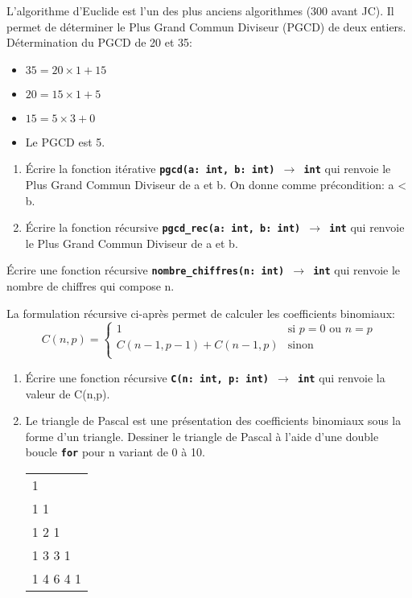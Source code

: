 \documentclass[a4paper,11pt]{article}
\begin{document}
\begin{exo}
    L'algorithme d'Euclide est l'un des plus anciens algorithmes (300 avant JC). Il permet de déterminer le Plus Grand Commun Diviseur (PGCD) de deux entiers.\\Détermination du PGCD de 20 et 35:
    \begin{itemize}
        \item $35=20×1+15$
        \item $20 = 15×1 + 5$
        \item $15 = 5×3 + 0$
        \item Le PGCD est 5.
    \end{itemize}
    \begin{enumerate}
        \item Écrire la fonction itérative \texttt{\textbf{pgcd(a: int, b: int) $\rightarrow$ int}} qui renvoie le Plus Grand Commun Diviseur de a et b. On donne comme précondition: a < b.
        \item Écrire la fonction récursive \texttt{\textbf{pgcd\_rec(a: int, b: int) $\rightarrow$ int}} qui renvoie le Plus Grand Commun Diviseur de a et b. 
    \end{enumerate}
\end{exo}
\begin{exo}
    Écrire une fonction récursive \texttt{\textbf{nombre\_chiffres(n: int) $\rightarrow$ int}} qui renvoie le nombre de chiffres qui compose n.
\end{exo}
\begin{exo}
    La formulation récursive ci-après permet de calculer les coefficients binomiaux:
    $$
        C(n,p) = \left\{
        \begin{array}{ll}
            1                   & \mbox{si } p=0 \mbox{ ou } n=p \\
            C(n-1,p-1)+C(n-1,p) & \mbox{sinon}                   \\
        \end{array}
        \right.
    $$
    \begin{enumerate}
        \item Écrire une fonction récursive \texttt{\textbf{C(n: int, p: int) $\rightarrow$ int}} qui renvoie la valeur de C(n,p).
        \item Le triangle de Pascal est une présentation des coefficients binomiaux sous la forme d'un triangle. Dessiner le triangle de Pascal à l'aide d'une double boucle \textbf{\texttt{for}} pour n variant de 0 à 10.
              \begin{center}
                  \begin{tabular}{l}
                      1         \\
                      1 1       \\
                      1 2 1     \\
                      1 3 3 1   \\
                      1 4 6 4 1 \\
                  \end{tabular}
              \end{center}

    \end{enumerate}
\end{exo}
\end{document}
